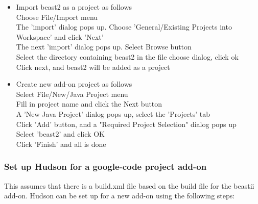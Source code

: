 \documentclass{article}
\begin{document}
\begin{itemize}
\item Import beast2 as a project as follows\\
Choose File/Import menu\\
The 'import' dialog pops up. Choose 'General/Existing Projects into Workspace'
and click 'Next'\\
The next 'import' dialog pops up. Select Browse button\\
Select the directory containing beast2 in the file choose dialog, click ok\\
Click next, and beast2 will be added as a project\\
\item Create new add-on project as follows\\
Select File/New/Java Project menu\\
Fill in project name and click the Next button\\
A 'New Java Project' dialog pops up, select the 'Projects' tab\\
Click 'Add' button, and a "Required Project Selection" dialog pops up\\
Select 'beast2' and click OK\\
Click 'Finish' and all is done
\end{itemize}


\subsubsection{Set up Hudson for a google-code project add-on}

This assumes that there is a build.xml file based on the
build file for the beastii add-on. Hudson can be set up for
a new add-on using the following steps:
\end{document}
